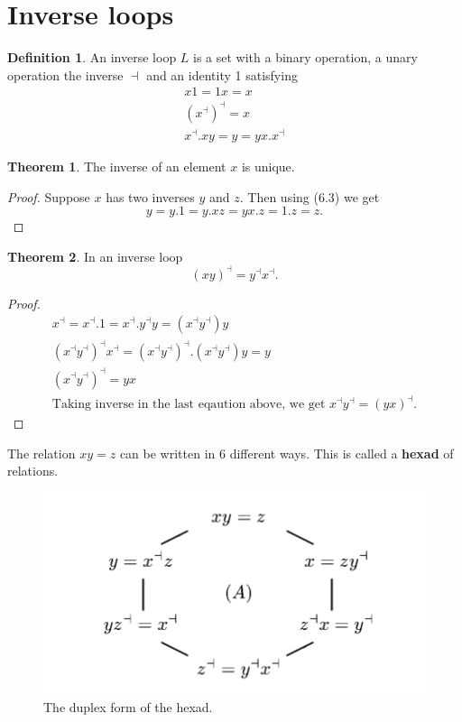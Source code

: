 \documentclass[11pt]{report}
\theoremstyle{plain}
\theoremstyle{definition}
\newtheorem{defn}{Definition}
\newtheorem{theorem}{Theorem}
\begin{document}
\section{Inverse loops}
\begin{defn}
	An inverse loop $ L $ is a set with a binary operation, a unary operation the inverse $ \dashv $ and an identity 1 satisfying
	\begin{align}
	x1=1x=x\\
	(x^\dashv)^\dashv = x\\
	x^\dashv. xy =y = yx.x^\dashv
	\end{align}
\end{defn}	
\begin{theorem}
	The inverse of an element $ x $ is unique.
\end{theorem}
\begin{proof}
Suppose $x $ has two inverses $ y $ and $ z $. Then using (6.3)  we get $$ y = y.1 = y.xz = yx.z = 1.z = z. $$
\end{proof}
\begin{theorem}
	In an inverse loop $$(xy)^\dashv = y^\dashv x^\dashv.$$
\end{theorem}
\begin{proof}
	\begin{gather*}
	x^\dashv = x^\dashv.1 = x^\dashv.y^\dashv y = (x^\dashv y^\dashv)y\\
	(x^\dashv y^\dashv)^\dashv x^\dashv = (x^\dashv y^\dashv)^\dashv . (x^\dashv y^\dashv)y =y\\
	(x^\dashv y^\dashv)^\dashv = yx\\
	\text{Taking inverse in the last eqaution above, we get }
	x^\dashv y^\dashv = (yx)^\dashv.
	\end{gather*}
\end{proof}
The relation $ xy=z $ can be written in 6 different ways. This is called a \textbf{hexad} of relations.

\begin{figure}[h]
	\includegraphics[scale = 0.9]{onqando}
	\centering
	\caption{The duplex form of the hexad.}
\end{figure}
\end{document}
